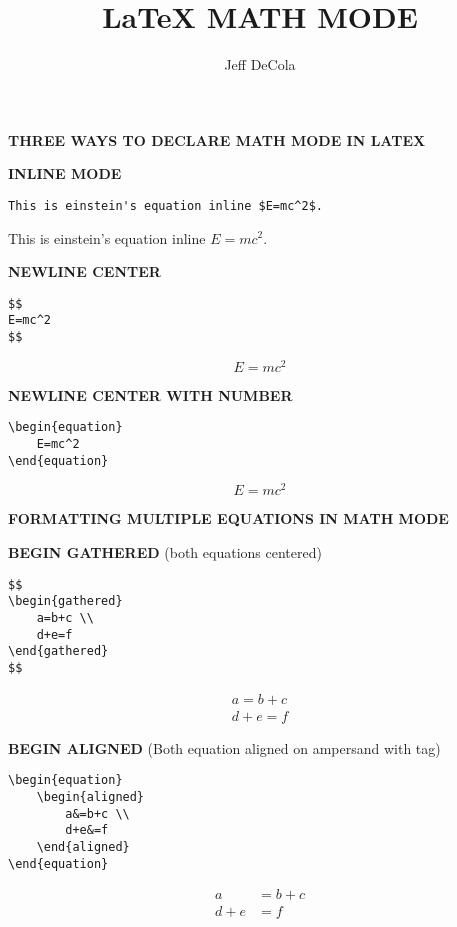 \documentclass[10pt]{article}
\title{\vspace{-5.0cm}LaTeX MATH MODE}
\author{\vspace{-0.1cm}Jeff DeCola}
\date{\vspace{-0.5cm}}
\begin{document}
\maketitle

\begin{center}
\textbf{THREE WAYS TO DECLARE MATH MODE IN LATEX}
\end{center}

\textbf{INLINE MODE}

\begin{lstlisting}
This is einstein's equation inline $E=mc^2$.
\end{lstlisting}

This is einstein's equation inline $E=mc^2$.

\textbf{NEWLINE CENTER}

\begin{lstlisting}
$$
E=mc^2
$$
\end{lstlisting}

$$
E=mc^2
$$

\textbf{NEWLINE CENTER WITH NUMBER}

\begin{lstlisting}
\begin{equation}
	E=mc^2
\end{equation}
\end{lstlisting}

\begin{equation}
	E=mc^2
\end{equation}

\begin{center}
\textbf{FORMATTING MULTIPLE EQUATIONS IN MATH MODE}
\end{center}

\textbf{BEGIN GATHERED} (both equations centered)

\begin{lstlisting}
$$
\begin{gathered}
    a=b+c \\
    d+e=f
\end{gathered}    
$$
\end{lstlisting}

$$
\begin{gathered}
    a=b+c \\
    d+e=f
\end{gathered}    
$$

\textbf{BEGIN ALIGNED} (Both equation aligned on ampersand with tag)

\begin{lstlisting}
\begin{equation}
    \begin{aligned}
        a&=b+c \\
        d+e&=f
    \end{aligned}
\end{equation}
\end{lstlisting}

\begin{equation}
    \begin{aligned}
        a&=b+c \\
        d+e&=f
    \end{aligned}
\end{equation}
\end{document}
